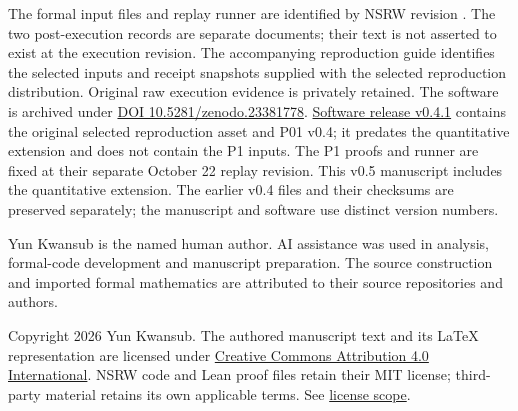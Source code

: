 \documentclass[11pt,a4paper]{article}
\begin{document}
The formal input files and replay runner are identified by NSRW revision  \cite{ref2}. The two post-execution records \cite{ref4,ref5} are separate documents; their text is not asserted to exist at the execution revision. The accompanying reproduction guide identifies the selected inputs and receipt snapshots supplied with the selected reproduction distribution. Original raw execution evidence is privately retained. The software is archived under \href{https://doi.org/10.5281/zenodo.23381778}{DOI 10.5281/zenodo.23381778}. \href{https://github.com/flamehaven01/NavierStokes-Research-Workbench/releases/tag/v0.4.1}{Software release v0.4.1} contains the original selected reproduction asset and P01 v0.4; it predates the quantitative extension and does not contain the P1 inputs. The P1 proofs and runner are fixed at their separate October 22 replay revision. This v0.5 manuscript includes the quantitative extension. The earlier v0.4 files and their checksums are preserved separately; the manuscript and software use distinct version numbers.

Yun Kwansub is the named human author. AI assistance was used in analysis, formal-code development and manuscript preparation. The source construction and imported formal mathematics are attributed to their source repositories and authors.

Copyright \textcopyright{} 2026 Yun Kwansub. The authored manuscript text and its LaTeX representation are licensed under \href{https://creativecommons.org/licenses/by/4.0/}{Creative Commons Attribution 4.0 International}. NSRW code and Lean proof files retain their MIT license; third-party material retains its own applicable terms. See \href{https://github.com/flamehaven01/NavierStokes-Research-Workbench/blob/da646614c7022777b0bd095eaf0111dcf1157e8f/research-papers/LICENSE-PAPERS.md}{license scope}.
\end{document}
